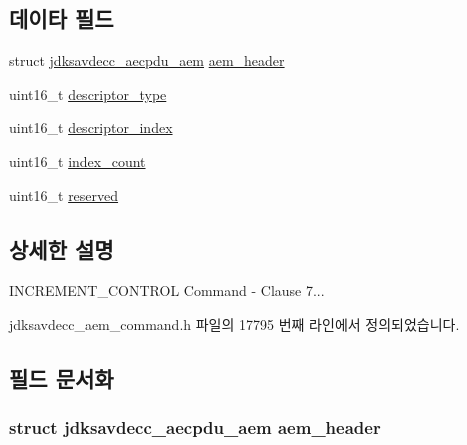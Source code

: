 \subsection*{데이타 필드}
\begin{DoxyCompactItemize}
\item 
struct \hyperlink{structjdksavdecc__aecpdu__aem}{jdksavdecc\+\_\+aecpdu\+\_\+aem} \hyperlink{structjdksavdecc__aem__command__increment__control_ae1e77ccb75ff5021ad923221eab38294}{aem\+\_\+header}
\item 
uint16\+\_\+t \hyperlink{structjdksavdecc__aem__command__increment__control_ab7c32b6c7131c13d4ea3b7ee2f09b78d}{descriptor\+\_\+type}
\item 
uint16\+\_\+t \hyperlink{structjdksavdecc__aem__command__increment__control_a042bbc76d835b82d27c1932431ee38d4}{descriptor\+\_\+index}
\item 
uint16\+\_\+t \hyperlink{structjdksavdecc__aem__command__increment__control_a07c424faad8558baa0910454cb2d463b}{index\+\_\+count}
\item 
uint16\+\_\+t \hyperlink{structjdksavdecc__aem__command__increment__control_a5a6ed8c04a3db86066924b1a1bf4dad3}{reserved}
\end{DoxyCompactItemize}


\subsection{상세한 설명}
I\+N\+C\+R\+E\+M\+E\+N\+T\+\_\+\+C\+O\+N\+T\+R\+OL Command -\/ Clause 7... 

jdksavdecc\+\_\+aem\+\_\+command.\+h 파일의 17795 번째 라인에서 정의되었습니다.



\subsection{필드 문서화}
\subsubsection[{\texorpdfstring{aem\+\_\+header}{aem_header}}]{\setlength{\rightskip}{0pt plus 5cm}struct {\bf jdksavdecc\+\_\+aecpdu\+\_\+aem} aem\+\_\+header}\hypertarget{structjdksavdecc__aem__command__increment__control_ae1e77ccb75ff5021ad923221eab38294}{}\label{structjdksavdecc__aem__command__increment__control_ae1e77ccb75ff5021ad923221eab38294}


